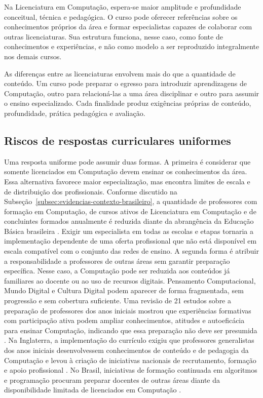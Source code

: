 Na Licenciatura em Computação, espera-se maior amplitude e profundidade conceitual, técnica e pedagógica. O curso pode oferecer referências sobre os conhecimentos próprios da área e formar especialistas capazes de colaborar com outras licenciaturas. Sua estrutura funciona, nesse caso, como fonte de conhecimentos e experiências, e não como modelo a ser reproduzido integralmente nos demais cursos.

As diferenças entre as licenciaturas envolvem mais do que a quantidade de conteúdo. Um curso pode preparar o egresso para introduzir aprendizagens de Computação, outro para relacioná-las a uma área disciplinar e outro para assumir o ensino especializado. Cada finalidade produz exigências próprias de conteúdo, profundidade, prática pedagógica e avaliação.

\subsection{Riscos de respostas curriculares uniformes}
\label{subsec:riscos-respostas-uniformes}

Uma resposta uniforme pode assumir duas formas. A primeira é considerar que somente licenciados em Computação devem ensinar os conhecimentos da área. Essa alternativa favorece maior especialização, mas encontra limites de escala e de distribuição dos profissionais. Conforme discutido na Subseção~\ref{subsec:evidencias-contexto-brasileiro}, a quantidade de professores com formação em Computação, de cursos ativos de Licenciatura em Computação e de concluintes formados anualmente é reduzida diante da abrangência da Educação Básica brasileira \cite{sbc2025grandesdesafios,sbc2022estatisticas,brasil2026emec}. Exigir um especialista em todas as escolas e etapas tornaria a implementação dependente de uma oferta profissional que não está disponível em escala compatível com o conjunto das redes de ensino.
A segunda forma é atribuir a responsabilidade a professores de outras áreas sem garantir preparação específica. Nesse caso, a Computação pode ser reduzida aos conteúdos já familiares ao docente ou ao uso de recursos digitais. Pensamento Computacional, Mundo Digital e Cultura Digital podem aparecer de forma fragmentada, sem progressão e sem cobertura suficiente. Uma revisão de 21 estudos sobre a preparação de professores dos anos iniciais mostrou que experiências formativas com participação ativa podem ampliar conhecimentos, atitudes e autoeficácia para ensinar Computação, indicando que essa preparação não deve ser presumida \cite{masonrich2019preparing}. Na Inglaterra, a implementação do currículo exigiu que professores generalistas dos anos iniciais desenvolvessem conhecimentos de conteúdo e de pedagogia da Computação e levou à criação de iniciativas nacionais de recrutamento, formação e apoio profissional \cite{fowlervegas2021england}. No Brasil, iniciativas de formação continuada em algoritmos e programação procuram preparar docentes de outras áreas diante da disponibilidade limitada de licenciados em Computação \cite{kretzer2020formacao}.

